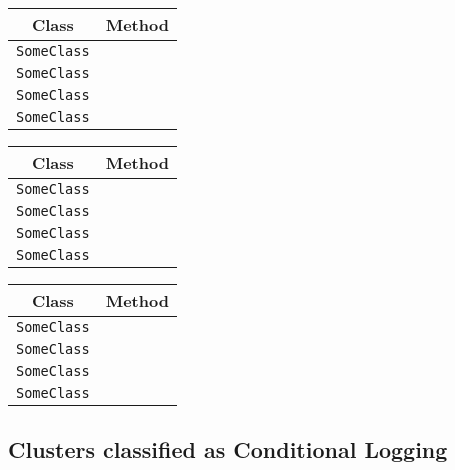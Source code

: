 \begin{center}
\begin{tabular}{ll}\toprule
\multicolumn{1}{c}{Class}&\multicolumn{1}{c}{Method}\\\midrule
\lstinline/SomeClass/&\raisebox{0pt}{\lstinline/foo(int)/}\\
\lstinline/SomeClass/&\raisebox{0pt}{\lstinline/foo(int)/}\\
\lstinline/SomeClass/&\raisebox{0pt}{\lstinline/foo(int)/}\\
\lstinline/SomeClass/&\raisebox{0pt}{\lstinline/foo(int)/}\\
\bottomrule
\end{tabular}
\end{center}

\begin{center}
\begin{tabular}{ll}\toprule
\multicolumn{1}{c}{Class}&\multicolumn{1}{c}{Method}\\\midrule
\lstinline/SomeClass/&\raisebox{0pt}{\lstinline/foo(int)/}\\
\lstinline/SomeClass/&\raisebox{0pt}{\lstinline/foo(int)/}\\
\lstinline/SomeClass/&\raisebox{0pt}{\lstinline/foo(int)/}\\
\lstinline/SomeClass/&\raisebox{0pt}{\lstinline/foo(int)/}\\
\bottomrule
\end{tabular}
\end{center}

\begin{center}
\begin{tabular}{ll}\toprule
\multicolumn{1}{c}{Class}&\multicolumn{1}{c}{Method}\\\midrule
\lstinline/SomeClass/&\raisebox{0pt}{\lstinline/foo(int)/}\\
\lstinline/SomeClass/&\raisebox{0pt}{\lstinline/foo(int)/}\\
\lstinline/SomeClass/&\raisebox{0pt}{\lstinline/foo(int)/}\\
\lstinline/SomeClass/&\raisebox{0pt}{\lstinline/foo(int)/}\\
\bottomrule
\end{tabular}
\end{center}

\subsection{Clusters classified as Conditional Logging}

